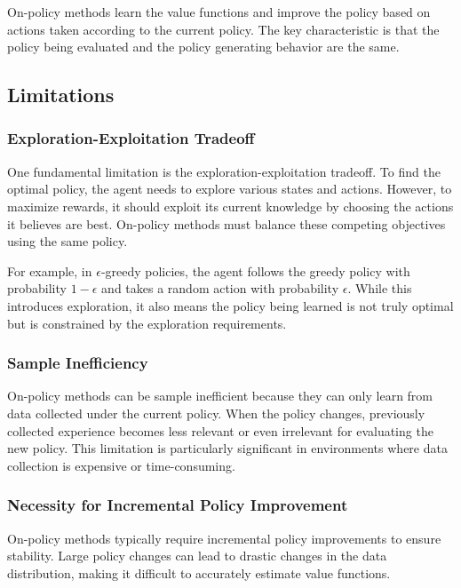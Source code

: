 \documentclass[11pt,a4paper]{article}
\begin{document}
On-policy methods learn the value functions and improve the policy based on actions taken according to the current policy. The key characteristic is that the policy being evaluated and the policy generating behavior are the same.

\subsection{Limitations}

\subsubsection{Exploration-Exploitation Tradeoff}

One fundamental limitation is the exploration-exploitation tradeoff. To find the optimal policy, the agent needs to explore various states and actions. However, to maximize rewards, it should exploit its current knowledge by choosing the actions it believes are best. On-policy methods must balance these competing objectives using the same policy.

For example, in $\epsilon$-greedy policies, the agent follows the greedy policy with probability $1-\epsilon$ and takes a random action with probability $\epsilon$. While this introduces exploration, it also means the policy being learned is not truly optimal but is constrained by the exploration requirements.

\subsubsection{Sample Inefficiency}

On-policy methods can be sample inefficient because they can only learn from data collected under the current policy. When the policy changes, previously collected experience becomes less relevant or even irrelevant for evaluating the new policy. This limitation is particularly significant in environments where data collection is expensive or time-consuming.

\subsubsection{Necessity for Incremental Policy Improvement}

On-policy methods typically require incremental policy improvements to ensure stability. Large policy changes can lead to drastic changes in the data distribution, making it difficult to accurately estimate value functions.
\end{document}
